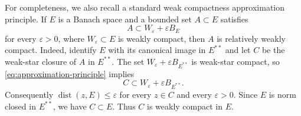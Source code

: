 \documentclass[11pt]{article}
\theoremstyle{remark}
\DeclareMathOperator{\dist}{dist}
\begin{document}
For completeness, we also recall a standard weak compactness
approximation principle. If $E$ is a Banach space and a bounded set
$A\subset E$ satisfies
\begin{equation}\label{eq:approximation-principle}
  A\subset W_\varepsilon+\varepsilon B_E
\end{equation}
for every $\varepsilon>0$, where $W_\varepsilon\subset E$ is weakly
compact, then $A$ is relatively weakly compact.
Indeed, identify $E$ with its canonical image in $E^{**}$ and let $C$
be the weak-star closure of $A$ in $E^{**}$. The set
$W_\varepsilon+\varepsilon B_{E^{**}}$ is weak-star compact, so
\eqref{eq:approximation-principle} implies
\[
  C\subset W_\varepsilon+\varepsilon B_{E^{**}}.
\]
Consequently $\dist(z,E)\leq\varepsilon$ for every $z\in C$ and every
$\varepsilon>0$. Since $E$ is norm closed in $E^{**}$, we have $C\subset E$.
Thus $C$ is weakly compact in $E$.
\end{document}
